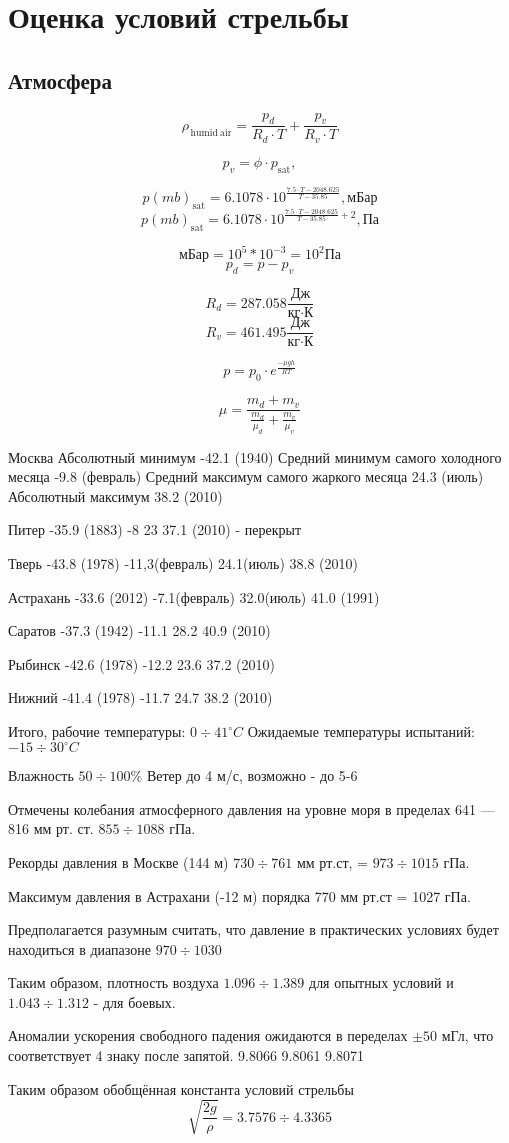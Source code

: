 \section{Оценка условий стрельбы}
\subsection{Атмосфера}

$$\rho_{\,\mathrm{humid~air}} = \frac{p_{d}}{R_{d} \cdot T} + \frac{p_{v}}{R_{v} \cdot T}$$

$$p_{v} = \phi \cdot p_{\mathrm{sat}},$$

$$p(mb)_{\mathrm{sat}} = 6.1078 \cdot 10^{\frac{7.5 \cdot T-2048.625}{T-35.85}}, \mbox{мБар}$$
$$p(mb)_{\mathrm{sat}} = 6.1078 \cdot 10^{\frac{7.5 \cdot T-2048.625}{T-35.85}+2}, \mbox{Па}$$

$$\mbox{мБар} = 10^5 * 10^{-3} = 10^2 \mbox{Па}$$
$$p_{d} = p-p_{v}$$

$$R_{d} = 287.058 \frac{\mbox{Дж}}{\mbox{кг·К}}$$
$$R_{v} = 461.495 \frac{\mbox{Дж}}{\mbox{кг·К}}$$

$$p = p_0 \cdot e^\frac{-\mu g h}{R T}$$

$$\mu = \frac{m_d + m_v}{\frac{m_d}{\mu_d}+\frac{m_v}{\mu_v}}$$

Москва
Абсолютный минимум -42.1 (1940)
Средний минимум самого холодного месяца -9.8 (февраль)
Средний максимум самого жаркого месяца 24.3 (июль)
Абсолютный максимум 38.2 (2010)

Питер -35.9 (1883)	-8 23 37.1 (2010) - перекрыт

Тверь -43.8 (1978)	-11,3(февраль) 24.1(июль)		38.8 (2010)

Астрахань -33.6 (2012)	-7.1(февраль)	32.0(июль) 41.0 (1991)


Саратов -37.3 (1942)	-11.1		28.2	40.9 (2010)

Рыбинск -42.6 (1978)	-12.2	23.6	37.2 (2010)

Нижний -41.4 (1978)	-11.7	24.7 38.2 (2010)

Итого, рабочие температуры: $0 \div 41 ^\circ C$
Ожидаемые температуры испытаний: $-15 \div 30 ^\circ C$

Влажность $50 \div 100\% $
Ветер до 4 м/с, возможно - до 5-6

Отмечены колебания атмосферного давления на уровне моря в пределах 641 — 816 мм рт. ст. $855 \div 1088$ гПа.

Рекорды давления в Москве (144 м) $730 \div 761$ мм рт.ст, = $973 \div 1015$ гПа.

Максимум давления в Астрахани (-12 м) порядка 770 мм рт.ст = 1027 гПа.

Предполагается разумным считать, что давление в практических условиях будет находиться в диапазоне $970 \div 1030$

Таким образом, плотность воздуха $1.096 \div 1.389$ для опытных условий и $1.043 \div 1.312$ - для боевых.

Аномалии ускорения свободного падения ожидаются в переделах $\pm 50$ мГл, что соответствует 4 знаку после запятой. 9.8066 9.8061 9.8071

Таким образом обобщённая константа условий стрельбы
$$\sqrt{\frac{2g}{\rho}} = 3.7576 \div 4.3365$$
